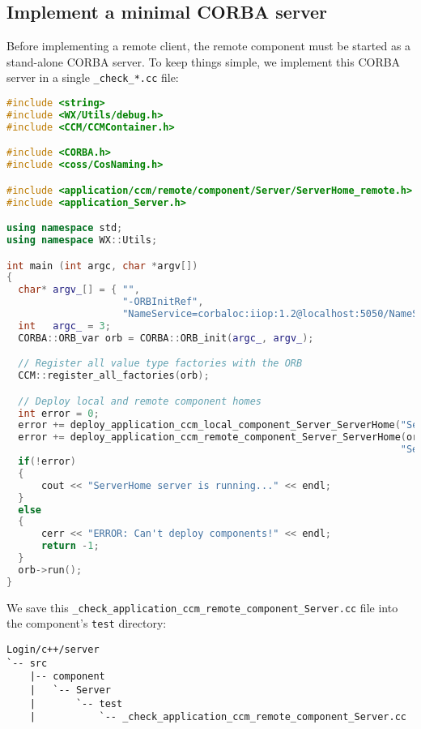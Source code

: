 \subsection{Implement a minimal CORBA server}
\label{subsection:ImplementMinimalCorbaAserver}
Before implementing a remote client, the remote component must be started as a
stand-alone CORBA server.
To keep things simple, we implement this CORBA server in a single 
{\tt \_check\_*.cc} file:
\begin{footnotesize}
\begin{lstlisting}[language=C++]
#include <string>
#include <WX/Utils/debug.h>
#include <CCM/CCMContainer.h>

#include <CORBA.h>
#include <coss/CosNaming.h>

#include <application/ccm/remote/component/Server/ServerHome_remote.h>
#include <application_Server.h>

using namespace std;
using namespace WX::Utils;

int main (int argc, char *argv[])
{
  char* argv_[] = { "", 
                    "-ORBInitRef", 
                    "NameService=corbaloc:iiop:1.2@localhost:5050/NameService"}; 
  int   argc_ = 3;
  CORBA::ORB_var orb = CORBA::ORB_init(argc_, argv_);

  // Register all value type factories with the ORB  
  CCM::register_all_factories(orb);

  // Deploy local and remote component homes	
  int error = 0;
  error += deploy_application_ccm_local_component_Server_ServerHome("ServerHome");
  error += deploy_application_ccm_remote_component_Server_ServerHome(orb, 
                                                                    "ServerHome");
  if(!error) 
  {
      cout << "ServerHome server is running..." << endl;
  }
  else 
  {
      cerr << "ERROR: Can't deploy components!" << endl;
      return -1;
  }
  orb->run();
}
\end{lstlisting}
\end{footnotesize}

We save this {\tt \_check\_application\_ccm\_remote\_component\_Server.cc} file
into the component's {\tt test} directory:
\begin{footnotesize}
\begin{verbatim}
Login/c++/server
`-- src
    |-- component
    |   `-- Server
    |       `-- test
    |           `-- _check_application_ccm_remote_component_Server.cc
\end{verbatim}
\end{footnotesize}

